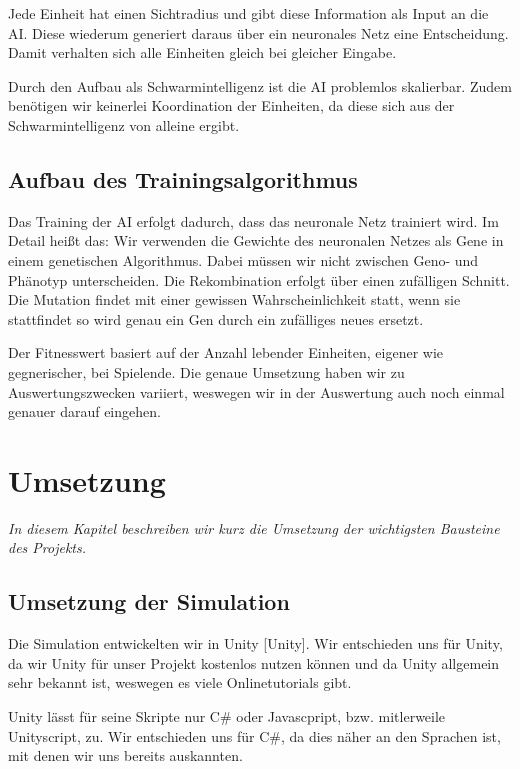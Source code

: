 \documentclass[
	12pt,
	a4paper,
	BCOR10mm,
	DIV14,
	headsepline,
	usegeometry,
]{scrreprt}
\begin{document}
Jede Einheit hat einen Sichtradius und gibt diese Information als Input an die AI. 
Diese wiederum generiert daraus über ein neuronales Netz eine Entscheidung. 
Damit verhalten sich alle Einheiten gleich bei gleicher Eingabe. 

Durch den Aufbau als Schwarmintelligenz ist die AI problemlos skalierbar. 
Zudem benötigen wir keinerlei Koordination der Einheiten, da diese sich aus der Schwarmintelligenz von alleine ergibt.

\section{Aufbau des Trainingsalgorithmus}
Das Training der AI erfolgt dadurch, dass das neuronale Netz trainiert wird.
Im Detail heißt das: Wir verwenden die Gewichte des neuronalen Netzes als Gene in einem genetischen Algorithmus.
Dabei müssen wir nicht zwischen Geno- und Phänotyp unterscheiden.
Die Rekombination erfolgt über einen zufälligen Schnitt.
Die Mutation findet mit einer gewissen Wahrscheinlichkeit statt, wenn sie stattfindet so wird genau ein Gen durch ein zufälliges neues ersetzt.

Der Fitnesswert basiert auf der Anzahl lebender Einheiten, eigener wie gegnerischer, bei Spielende.
Die genaue Umsetzung haben wir zu Auswertungszwecken variiert, weswegen wir in der Auswertung auch noch einmal genauer darauf eingehen.

\chapter{Umsetzung}
\label{Umsetzung}

\textit{%
In diesem Kapitel beschreiben wir kurz die Umsetzung der wichtigsten Bausteine des Projekts.
}

\bigskip

\section{Umsetzung der Simulation}
Die Simulation entwickelten wir in Unity [Unity].
Wir entschieden uns für Unity, da wir Unity für unser Projekt kostenlos nutzen können und da Unity allgemein sehr bekannt ist, weswegen es viele Onlinetutorials gibt.

Unity lässt für seine Skripte nur C\# oder Javascpript, bzw. mitlerweile Unityscript, zu.
Wir entschieden uns für C\#, da dies näher an den Sprachen ist, mit denen wir uns bereits auskannten.
\end{document}

